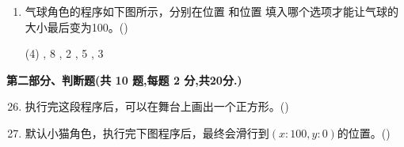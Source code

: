 \documentclass[10pt, a4paper]{article}
\newcommand{\hq}{\hfill(\qquad)}
\begin{document}
\begin{enumerate}
        \item 气球角色的程序如下图所示，分别在位置  和位置  填入哪个选项才能让气球的大小最后变为100。\hq
        \begin{tasks}(4)
            , 8
            , 2
            , 5
            , 3
        \end{tasks}
    \end{enumerate}

    \newpage
    {\noindent\textbf{第二部分、判断题(共 10 题,每题 2 分,共20分.)}}
    \begin{enumerate}
        \setcounter{enumi}{25}
        \item 执行完这段程序后，可以在舞台上画出一个正方形。\hq

        \item 默认小猫角色，执行完下图程序后，最终会滑行到$(x:100,y:0)$的位置。\hq
        

\end{enumerate}
\end{document}
